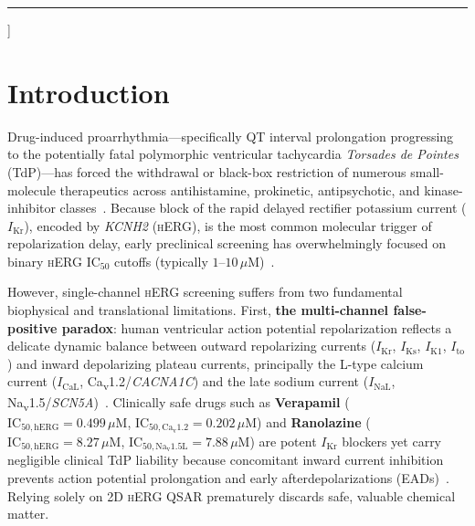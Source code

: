 \documentclass[10pt,twocolumn,letterpaper]{article}
\begin{document}
\begin{@twocolumnfalse}
  \vspace{0.20em}
  \vspace{0.55em}
  \noindent\textcolor{HairlineGray}{\rule{\linewidth}{0.6pt}}
  \vspace{0.8em}
\end{@twocolumnfalse}
]

\section{Introduction}
\label{sec:intro}

Drug-induced proarrhythmia---specifically QT interval prolongation progressing to the potentially fatal polymorphic ventricular tachycardia \textit{Torsades de Pointes} (TdP)---has forced the withdrawal or black-box restriction of numerous small-molecule therapeutics across antihistamine, prokinetic, antipsychotic, and kinase-inhibitor classes~\cite{sanguinetti2006herg,redfern2003relationships}. Because block of the rapid delayed rectifier potassium current ($I_{\mathrm{Kr}}$), encoded by \textit{KCNH2} (\textsc{hERG}), is the most common molecular trigger of repolarization delay, early preclinical screening has overwhelmingly focused on binary \textsc{hERG} $\mathrm{IC}_{50}$ cutoffs (typically $1$--$10\,\mu\mathrm{M}$)~\cite{jamieson2006medicinal}.

However, single-channel \textsc{hERG} screening suffers from two fundamental biophysical and translational limitations. First, \textbf{the multi-channel false-positive paradox}: human ventricular action potential repolarization reflects a delicate dynamic balance between outward repolarizing currents ($I_{\mathrm{Kr}}$, $I_{\mathrm{Ks}}$, $I_{\mathrm{K1}}$, $I_{\mathrm{to}}$) and inward depolarizing plateau currents, principally the L-type calcium current ($I_{\mathrm{CaL}}$, Ca\textsubscript{v}1.2/\textit{CACNA1C}) and the late sodium current ($I_{\mathrm{NaL}}$, Na\textsubscript{v}1.5/\textit{SCN5A})~\cite{ohara2011simulation}. Clinically safe drugs such as \textbf{Verapamil} ($\mathrm{IC}_{50,\mathrm{hERG}} = 0.499\,\mu\mathrm{M}$, $\mathrm{IC}_{50,\mathrm{Ca_v1.2}} = 0.202\,\mu\mathrm{M}$) and \textbf{Ranolazine} ($\mathrm{IC}_{50,\mathrm{hERG}} = 8.27\,\mu\mathrm{M}$, $\mathrm{IC}_{50,\mathrm{Na_v1.5L}} = 7.88\,\mu\mathrm{M}$) are potent $I_{\mathrm{Kr}}$ blockers yet carry negligible clinical TdP liability because concomitant inward current inhibition prevents action potential prolongation and early afterdepolarizations (EADs)~\cite{colatsky2016comprehensive,crumb2016evaluation}. Relying solely on 2D \textsc{hERG} QSAR prematurely discards safe, valuable chemical matter.
\end{document}
